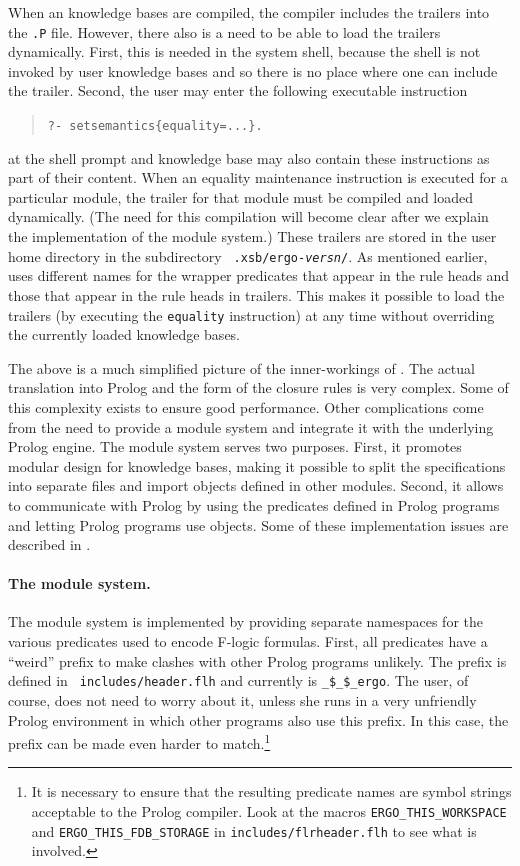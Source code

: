 \documentclass[11pt]{article}
\newcommand{\ERGO}{\mbox{\smaller{\ensuremath{\cal{E}}\smaller{{\sc{RGO}}}}}\xspace}
\newcommand{\FLSYSTEM}{\ERGO}
\newcommand{\fl}{\mbox{F-logic}\xspace}
\begin{document}
When an \FLSYSTEM knowledge bases are compiled, the compiler includes the trailers into
the {\tt .P} file. However, there also is a need to be able to load the
trailers dynamically. First, this is needed in the system shell, because
the shell is not invoked by user knowledge bases and so there is
no place where one can include the trailer. Second, the user may enter the
following executable instruction 
\begin{quote}
   {\tt ?- setsemantics\{equality=...\}. }
\end{quote}
at the shell prompt and knowledge base may also contain these instructions as
part of their content.  When an equality maintenance instruction is executed
for a particular module, the trailer for that module must be compiled and
loaded dynamically.  (The need for this compilation will become clear after
we explain the implementation of the module system.)  These trailers are
stored in the user home directory in the subdirectory {\tt
  .xsb/ergo-\emph{versn}/}.
As mentioned earlier, \FLSYSTEM uses different names for the wrapper predicates
that appear in the rule heads and those that appear in the
rule heads in trailers. This makes it possible to load the trailers (by
executing the {\tt equality} instruction) at any time without overriding
the currently loaded knowledge bases.

The above is a much simplified picture of the inner-workings of \FLSYSTEM. The
actual translation into Prolog and the form of the closure rules is very
complex.  Some of this complexity exists to ensure good performance.  Other
complications come from the need to provide a module system and integrate
it with the underlying Prolog engine.  The module system serves two
purposes.  First, it promotes modular design for \FLSYSTEM knowledge bases, making it
possible to split the specifications into separate files and import objects defined
in other modules. Second, it allows \FLSYSTEM to communicate with
Prolog by using the predicates defined in Prolog programs and letting
Prolog programs use \FLSYSTEM objects.  Some of these implementation issues
are described in \cite{guiz-flora-00}.

\paragraph{The module system.} The module system is implemented by
providing separate namespaces for the various predicates used to encode \fl
formulas. First, all predicates have a ``weird'' prefix to make clashes with
other Prolog programs unlikely. The prefix is defined in {\tt
  includes/header.flh} and currently is {\tt \_\$\_\$\_ergo}. The user, of
course, does not need to worry about it, unless she runs \FLSYSTEM in
a very unfriendly Prolog environment in which other programs also use this
prefix. In this case, the prefix can be made
even harder to match.\footnote{
  It is necessary to ensure that the resulting predicate names are symbol
  strings acceptable to the Prolog compiler. Look at the macros
  {\tt ERGO\_THIS\_WORKSPACE} and {\tt ERGO\_THIS\_FDB\_STORAGE} in
  {\tt includes/flrheader.flh} to see what is involved.
  }
\end{document}
